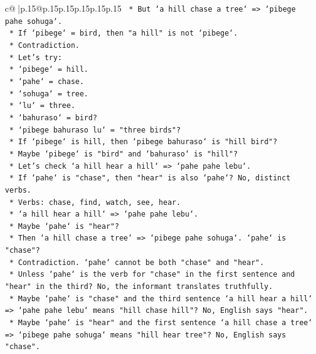 \documentclass{article}
\begin{document}
{\begin{supertabular}{c@{$\;$}|p{.15\linewidth}@{}p{.15\linewidth}p{.15\linewidth}p{.15\linewidth}p{.15\linewidth}p{.15\linewidth}}
{{{\texttt{        *   But `a hill chase a tree` => `pibege pahe sohuga`.} \\
\texttt{        *   If `pibege` = bird, then "a hill" is not `pibege`.} \\
\texttt{        *   Contradiction.} \\
\texttt{        *   Let's try:} \\
\texttt{            *   `pibege` = hill.} \\
\texttt{            *   `pahe` = chase.} \\
\texttt{            *   `sohuga` = tree.} \\
\texttt{            *   `lu` = three.} \\
\texttt{            *   `bahuraso` = bird?} \\
\texttt{            *   `pibege bahuraso lu` = "three birds"?} \\
\texttt{            *   If `pibege` is hill, then `pibege bahuraso` is "hill bird"?} \\
\texttt{            *   Maybe `pibege` is "bird" and `bahuraso` is "hill"?} \\
\texttt{            *   Let's check `a hill hear a hill` => `pahe pahe lebu`.} \\
\texttt{            *   If `pahe` is "chase", then "hear" is also `pahe`? No, distinct verbs.} \\
\texttt{            *   Verbs: chase, find, watch, see, hear.} \\
\texttt{            *   `a hill hear a hill` => `pahe pahe lebu`.} \\
\texttt{            *   Maybe `pahe` is "hear"?} \\
\texttt{            *   Then `a hill chase a tree` => `pibege pahe sohuga`. `pahe` is "chase"?} \\
\texttt{            *   Contradiction. `pahe` cannot be both "chase" and "hear".} \\
\texttt{            *   Unless `pahe` is the verb for "chase" in the first sentence and "hear" in the third? No, the informant translates truthfully.} \\
\texttt{            *   Maybe `pahe` is "chase" and the third sentence `a hill hear a hill` => `pahe pahe lebu` means "hill chase hill"? No, English says "hear".} \\
\texttt{            *   Maybe `pahe` is "hear" and the first sentence `a hill chase a tree` => `pibege pahe sohuga` means "hill hear tree"? No, English says "chase".} \\
}}}
\end{supertabular}}
\end{document}
